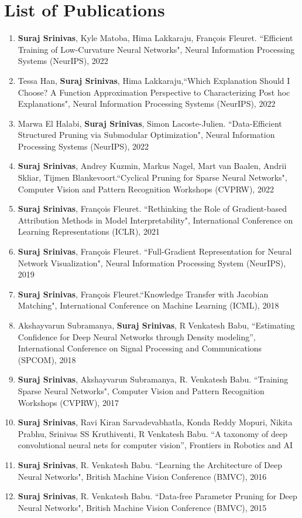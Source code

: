 \documentclass{article}
\begin{document}
\section*{List of Publications}

\begin{enumerate}
    \item \textbf{Suraj Srinivas}, Kyle Matoba, Hima Lakkaraju, Fran\c{c}ois Fleuret.
    ``Efficient Training of Low-Curvature Neural Networks", Neural Information Processing Systems (NeurIPS), 2022
    \item Tessa Han, \textbf{Suraj Srinivas}, Hima Lakkaraju,``Which Explanation Should I Choose? A Function Approximation Perspective to Characterizing Post hoc Explanations", Neural Information Processing Systems (NeurIPS), 2022
    \item Marwa El Halabi, \textbf{Suraj Srinivas}, Simon Lacoste-Julien.
    ``Data-Efficient Structured Pruning via Submodular Optimization", Neural Information Processing Systems (NeurIPS), 2022
    \item \textbf{Suraj Srinivas}, Andrey Kuzmin, Markus Nagel, Mart van Baalen, Andrii Skliar, Tijmen Blankevoort.``Cyclical Pruning for Sparse Neural Networks", Computer Vision and Pattern Recognition Workshops (CVPRW), 2022
    \item  \textbf{Suraj Srinivas}, Fran\c{c}ois Fleuret. ``Rethinking the Role of Gradient-based Attribution Methods in Model Interpretability", International Conference on Learning Representations (ICLR), 2021
    \item \textbf{Suraj Srinivas}, Fran\c{c}ois Fleuret. ``Full-Gradient Representation
    for Neural Network Visualization", Neural Information Processing System (NeurIPS), 2019
    \item \textbf{Suraj Srinivas}, Fran\c{c}ois Fleuret.``Knowledge Transfer with Jacobian Matching", International Conference on Machine Learning (ICML), 2018
    \item Akshayvarun Subramanya, \textbf{Suraj Srinivas}, R Venkatesh Babu, ``Estimating Confidence for Deep Neural Networks through Density modeling'', International Conference on Signal Processing and Communications (SPCOM), 2018
    \item \textbf{Suraj Srinivas}, Akshayvarun Subramanya, R. Venkatesh Babu. ``Training
    Sparse Neural Networks", Computer Vision and Pattern Recognition Workshops (CVPRW), 2017
    \item \textbf{Suraj Srinivas}, Ravi Kiran Sarvadevabhatla, Konda Reddy Mopuri, Nikita Prabhu, Srinivas SS Kruthiventi, R Venkatesh Babu. ``A taxonomy of deep convolutional neural nets for computer vision'', Frontiers in Robotics and AI
    \item \textbf{Suraj Srinivas}, R. Venkatesh Babu. ``Learning the Architecture of Deep Neural Networks", British Machine Vision Conference (BMVC), 2016
    \item \textbf{Suraj Srinivas}, R. Venkatesh Babu. ``Data-free Parameter Pruning for
    Deep Neural Networks", British Machine Vision Conference (BMVC), 2015

\end{enumerate}
\end{document}
